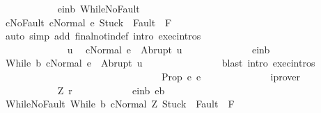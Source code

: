 \begin{isabellebody}
\ \ \ \ \ \ \ \ \ \ \isamarkupfalse%
\ e{\isacharunderscore}in{\isacharunderscore}b\ WhileNoFault\isanewline
\ \ \ \ \ \ \ \ \ \ \isamarkupfalse%
\ cNoFault{\isacharcolon}\ {\isachardoublequoteopen}{\isasymGamma}{\isasymturnstile}{\isasymlangle}c{\isacharcomma}Normal\ e{\isasymrangle}\ {\isasymRightarrow}{\isasymnotin}{\isacharparenleft}{\isacharbraceleft}Stuck{\isacharbraceright}\ {\isasymunion}\ Fault\ {\isacharbackquote}\ {\isacharparenleft}{\isacharminus}F{\isacharparenright}{\isacharparenright}{\isachardoublequoteclose}\isanewline
\ \ \ \ \ \ \ \ \ \ \ \ \isamarkupfalse%
\ {\isacharparenleft}auto\ simp\ add{\isacharcolon}\ final{\isacharunderscore}notin{\isacharunderscore}def\ intro{\isacharcolon}\ exec{\isachardot}intros{\isacharparenright}\isanewline
\ \ \ \ \ \ \ \ \ \ \isamarkupfalse%
\isanewline
\ \ \ \ \ \ \ \ \ \ \isacommand{{\isacharbraceleft}}\isamarkupfalse%
\isanewline
\ \ \ \ \ \ \ \ \ \ \ \ \isamarkupfalse%
\ u\ \isamarkupfalse%
\ {\isachardoublequoteopen}{\isasymGamma}{\isasymturnstile}{\isasymlangle}c{\isacharcomma}Normal\ e{\isasymrangle}\ {\isasymRightarrow}\ Abrupt\ u{\isachardoublequoteclose}\isanewline
\ \ \ \ \ \ \ \ \ \ \ \ \isamarkupfalse%
\ e{\isacharunderscore}in{\isacharunderscore}b\ \isamarkupfalse%
\ {\isachardoublequoteopen}{\isasymGamma}{\isasymturnstile}{\isasymlangle}While\ b\ c{\isacharcomma}Normal\ e{\isasymrangle}\ {\isasymRightarrow}\ Abrupt\ u{\isachardoublequoteclose}\isanewline
\ \ \ \ \ \ \ \ \ \ \ \ \ \ \isamarkupfalse%
\ {\isacharparenleft}blast\ intro{\isacharcolon}\ exec{\isachardot}intros{\isacharparenright}\isanewline
\ \ \ \ \ \ \ \ \ \ \isacommand{{\isacharbraceright}}\isamarkupfalse%
\isanewline
\ \ \ \ \ \ \ \ \ \ \isamarkupfalse%
\isanewline
\ \ \ \ \ \ \ \ \ \ \isamarkupfalse%
\ {\isachardoublequoteopen}{\isacharquery}Prop\ e\ e{\isachardoublequoteclose}\isanewline
\ \ \ \ \ \ \ \ \ \ \ \ \isamarkupfalse%
\ iprover\isanewline
\ \ \ \ \ \ \ \ \isamarkupfalse%
\isanewline
\ \ \ \ \ \ \ \ \ \ \isamarkupfalse%
\ Z\ r\isanewline
\ \ \ \ \ \ \ \ \ \ \isamarkupfalse%
\ e{\isacharunderscore}in{\isacharunderscore}b{\isacharcolon}\ {\isachardoublequoteopen}e{\isasymin}b{\isachardoublequoteclose}\ \isanewline
\ \ \ \ \ \ \ \ \ \ \isamarkupfalse%
\ WhileNoFault{\isacharcolon}\ {\isachardoublequoteopen}{\isasymGamma}{\isasymturnstile}{\isasymlangle}While\ b\ c{\isacharcomma}Normal\ Z{\isasymrangle}\ {\isasymRightarrow}{\isasymnotin}{\isacharparenleft}{\isacharbraceleft}Stuck{\isacharbraceright}\ {\isasymunion}\ Fault\ {\isacharbackquote}\ {\isacharparenleft}{\isacharminus}F{\isacharparenright}{\isacharparenright}{\isachardoublequoteclose}\isanewline

\end{isabellebody}
